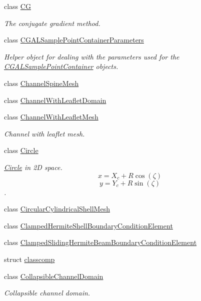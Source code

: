 \begin{DoxyCompactItemize}
class \hyperlink{classoomph_1_1CG}{CG}
\begin{DoxyCompactList}\small\item\em The conjugate gradient method. \end{DoxyCompactList}\item 
class \hyperlink{classoomph_1_1CGALSamplePointContainerParameters}{C\+G\+A\+L\+Sample\+Point\+Container\+Parameters}
\begin{DoxyCompactList}\small\item\em Helper object for dealing with the parameters used for the \hyperlink{classCGALSamplePointContainer}{C\+G\+A\+L\+Sample\+Point\+Container} objects. \end{DoxyCompactList}\item 
class \hyperlink{classoomph_1_1ChannelSpineMesh}{Channel\+Spine\+Mesh}
\item 
class \hyperlink{classoomph_1_1ChannelWithLeafletDomain}{Channel\+With\+Leaflet\+Domain}
\item 
class \hyperlink{classoomph_1_1ChannelWithLeafletMesh}{Channel\+With\+Leaflet\+Mesh}
\begin{DoxyCompactList}\small\item\em Channel with leaflet mesh. \end{DoxyCompactList}\item 
class \hyperlink{classoomph_1_1Circle}{Circle}
\begin{DoxyCompactList}\small\item\em \hyperlink{classoomph_1_1Circle}{Circle} in 2D space. \[ x = X_c + R \cos(\zeta) \] \[ y = Y_c + R \sin(\zeta) \]. \end{DoxyCompactList}\item 
class \hyperlink{classoomph_1_1CircularCylindricalShellMesh}{Circular\+Cylindrical\+Shell\+Mesh}
\item 
class \hyperlink{classoomph_1_1ClampedHermiteShellBoundaryConditionElement}{Clamped\+Hermite\+Shell\+Boundary\+Condition\+Element}
\item 
class \hyperlink{classoomph_1_1ClampedSlidingHermiteBeamBoundaryConditionElement}{Clamped\+Sliding\+Hermite\+Beam\+Boundary\+Condition\+Element}
\item 
struct \hyperlink{structoomph_1_1classcomp}{classcomp}
\item 
class \hyperlink{classoomph_1_1CollapsibleChannelDomain}{Collapsible\+Channel\+Domain}
\begin{DoxyCompactList}\small\item\em Collapsible channel domain. \end{DoxyCompactList}\item 

\end{DoxyCompactItemize}
